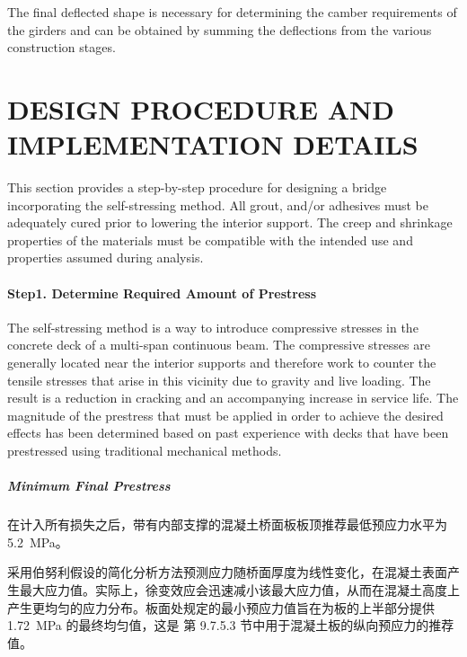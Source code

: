 The final deflected shape is necessary for determining the camber requirements of the girders and can be obtained by summing the deflections from the various construction stages.

\section{DESIGN PROCEDURE AND IMPLEMENTATION DETAILS}

This section provides a step-by-step procedure for designing a bridge incorporating the self-stressing method. All grout, and/or adhesives must be adequately cured prior to lowering the interior support. The creep and shrinkage properties of the materials must be compatible with the intended use and properties assumed during analysis.

\paragraph*{Step1. Determine Required Amount of Prestress}
The self-stressing method is a way to introduce compressive stresses in the concrete deck of a multi-span continuous beam. The compressive stresses are generally located near the interior supports and therefore work to counter the tensile stresses that arise in this vicinity due to gravity and live loading. The result is a reduction in cracking and an accompanying increase in service life. The magnitude of the prestress that must be applied in order to achieve the desired effects has been determined based on past experience with decks that have been prestressed using traditional mechanical methods.

\subparagraph*{Minimum Final Prestress}
在计入所有损失之后，带有内部支撑的混凝土桥面板板顶推荐最低预应力水平为 \qty{5.2}{MPa}。

采用伯努利假设的简化分析方法预测应力随桥面厚度为线性变化，在混凝土表面产生最大应力值。实际上，徐变效应会迅速减小该最大应力值，从而在混凝土高度上产生更均匀的应力分布。板面处规定的最小预应力值旨在为板的上半部分提供 \qty{1.72}{MPa} 的最终均匀值，这是 \lrfd 第 9.7.5.3 节中用于混凝土板的纵向预应力的推荐值。

